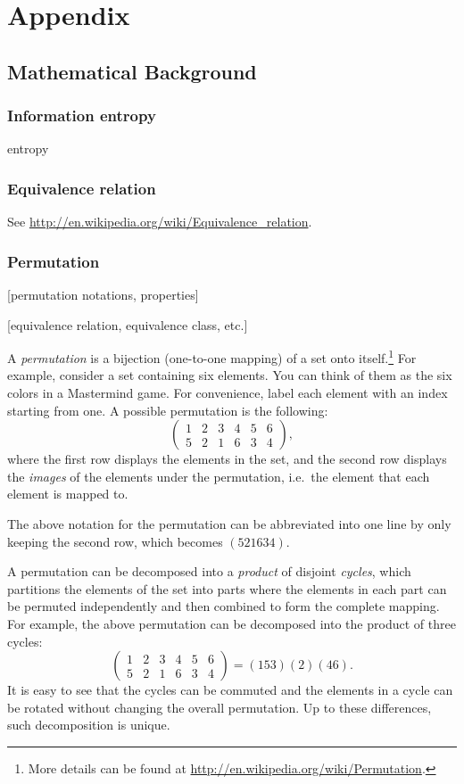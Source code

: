 \chapter{Appendix}

\section{Mathematical Background}

\subsection{Information entropy}

entropy

\subsection{Equivalence relation}

See \url{http://en.wikipedia.org/wiki/Equivalence\_relation}.

\subsection{Permutation}

[permutation notations, properties]

[equivalence relation, equivalence class, etc.]

A \emph{permutation} is a bijection (one-to-one mapping) of a set onto itself.\footnote{
More details can be found at \url{http://en.wikipedia.org/wiki/Permutation}.}
For example, consider a set containing six elements. You can think of them as the six colors in a Mastermind game. For convenience, label each element with an index starting from one. A possible permutation is the following:
\[
\begin{pmatrix}
1 & 2 & 3 & 4 & 5 & 6 \\
5 & 2 & 1 & 6 & 3 & 4
\end{pmatrix} ,
\]
where the first row displays the elements in the set, and the second row displays the \emph{images} of the elements under the permutation, i.e.\ the element that each element is mapped to.

The above notation for the permutation can be abbreviated into one line by only keeping the second row, which becomes $(5 2 1 6 3 4)$.

A permutation can be decomposed into a \emph{product} of disjoint \emph{cycles}, which partitions the elements of the set into parts where the elements in each part can be permuted independently and then combined to form the complete mapping. For example, the above permutation can be decomposed into the product of three cycles:
\[
\begin{pmatrix}
1 & 2 & 3 & 4 & 5 & 6 \\
5 & 2 & 1 & 6 & 3 & 4
\end{pmatrix} 
= (1 5 3) (2) (4 6) .
\]
It is easy to see that the cycles can be commuted and the elements in a cycle can be rotated without changing the overall permutation. Up to these differences, such decomposition is unique.


